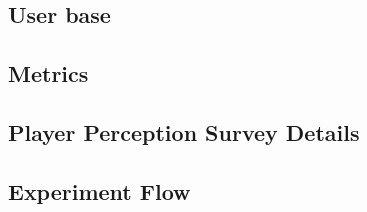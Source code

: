 
\subsection{User base}





\subsection{Metrics}


\subsection{Player Perception Survey Details}

\subsection{Experiment Flow}


